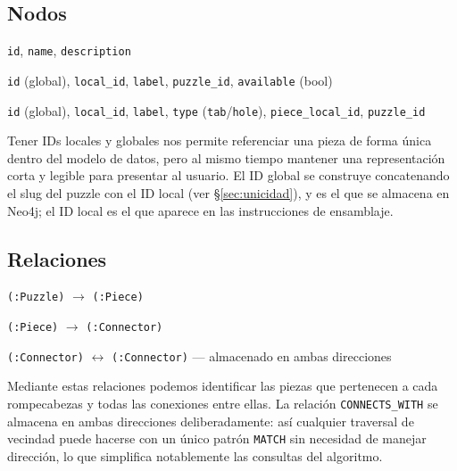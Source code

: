 \documentclass[12pt,a4paper]{article}
\begin{document}
\subsection{Nodos}

\begin{description}[leftmargin=3cm, style=sameline]
    \item[\texttt{:Puzzle}]    \texttt{id}, \texttt{name}, \texttt{description}
    \item[\texttt{:Piece}]     \texttt{id} (global), \texttt{local\_id}, \texttt{label}, \texttt{puzzle\_id}, \texttt{available} (bool)
    \item[\texttt{:Connector}] \texttt{id} (global), \texttt{local\_id}, \texttt{label}, \texttt{type} (\texttt{tab}/\texttt{hole}), \texttt{piece\_local\_id}, \texttt{puzzle\_id}
\end{description}

Tener IDs locales y globales nos permite referenciar una pieza de forma única
dentro del modelo de datos, pero al mismo tiempo mantener una representación
corta y legible para presentar al usuario. El ID global se construye
concatenando el slug del puzzle con el ID local (ver \S\ref{sec:unicidad}), y
es el que se almacena en Neo4j; el ID local es el que aparece en las
instrucciones de ensamblaje.

\subsection{Relaciones}

\begin{description}[leftmargin=4.5cm, style=sameline]
    \item[\texttt{CONTAINS}]       \texttt{(:Puzzle)} $\to$ \texttt{(:Piece)}
    \item[\texttt{HAS\_CONNECTOR}] \texttt{(:Piece)} $\to$ \texttt{(:Connector)}
    \item[\texttt{CONNECTS\_WITH}] \texttt{(:Connector)} $\leftrightarrow$ \texttt{(:Connector)} — almacenado en ambas direcciones
\end{description}

Mediante estas relaciones podemos identificar las piezas que pertenecen a cada
rompecabezas y todas las conexiones entre ellas. La relación
\texttt{CONNECTS\_WITH} se almacena en ambas direcciones deliberadamente: así
cualquier traversal de vecindad puede hacerse con un único patrón
\texttt{MATCH} sin necesidad de manejar dirección, lo que simplifica
notablemente las consultas del algoritmo.
\end{document}
